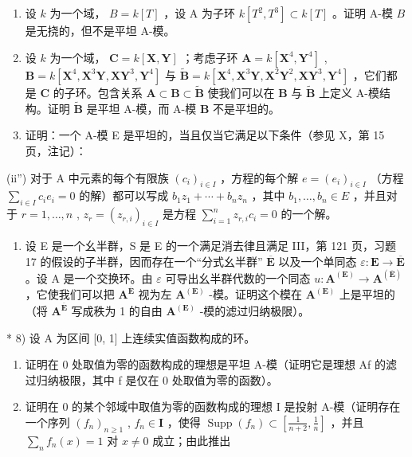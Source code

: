 \begin{enumerate}
\def\labelenumi{\arabic{enumi})}
\setcounter{enumi}{3}
\item
  设 \(k\) 为一个域， \(B = k[T]\) ，设 A 为子环 \(k[T^2, T^3] \subset k[T]\) 。证明 A-模 \(B\) 是无挠的，但不是平坦 A-模。
\item
  设 \(k\) 为一个域， \(\mathbf{C} = k[\mathbf{X}, \mathbf{Y}]\) ；考虑子环 \(\mathbf{A} = k[\mathbf{X}^4, \mathbf{Y}^4]\) , \(\mathbf{B} = k[\mathbf{X}^4, \mathbf{X}^3\mathbf{Y}, \mathbf{XY}^3, \mathbf{Y}^4]\) 与 \(\tilde{\mathbf{B}} = k[\mathbf{X}^4, \mathbf{X}^3\mathbf{Y}, \mathbf{X}^2\mathbf{Y}^2, \mathbf{XY}^3, \mathbf{Y}^4]\) ，它们都是 \(\mathbf{C}\) 的子环。包含关系 \(\mathbf{A} \subset \mathbf{B} \subset \tilde{\mathbf{B}}\) 使我们可以在 \(\mathbf{B}\) 与 \(\tilde{\mathbf{B}}\) 上定义 A-模结构。证明 \(\tilde{\mathbf{B}}\) 是平坦 A-模，而 A-模 \(\mathbf{B}\) 不是平坦的。
\item
  证明：一个 A-模 E 是平坦的，当且仅当它满足以下条件（参见 X，第 15 页，注记）：
\end{enumerate}

(ii'') 对于 A 中元素的每个有限族 \((c_{i})_{i\in I}\) ，方程的每个解 \(e = (e_i)_{i\in I}\) （方程 \(\sum_{i\in I}c_i e_i = 0\) 的解）都可以写成 \(b_1 z_1 + \cdots + b_n z_n\) ，其中 \(b_1, \ldots, b_n \in E\) ，并且对于 \(r = 1, \ldots, n\) , \(z_r = (z_{r,i})_{i \in I}\) 是方程 \(\sum_{i=1}^{n} z_{r,i} c_i = 0\) 的一个解。

\begin{enumerate}
\def\labelenumi{\arabic{enumi})}
\setcounter{enumi}{6}
\tightlist
\item
  设 E 是一个幺半群，S 是 E 的一个满足消去律且满足 III，第 121 页，习题 17 的假设的子半群，因而存在一个“分式幺半群” \(\overline{\mathbf{E}}\) 以及一个单同态 \(\varepsilon: \mathbf{E} \to \overline{\mathbf{E}}\) 。设 A 是一个交换环。由 \(\varepsilon\) 可导出幺半群代数的一个同态 \(u: \mathbf{A}^{(\mathbf{E})} \to \mathbf{A}^{(\overline{\mathbf{E}})}\) ，它使我们可以把 \(\mathbf{A}^{\overline{\mathbf{E}}}\) 视为左 \(\mathbf{A}^{(\mathbf{E})}\) -模。证明这个模在 \(\mathbf{A}^{(\mathbf{E})}\) 上是平坦的（将 \(\mathbf{A}^{\overline{\mathbf{E}}}\) 写成秩为 1 的自由 \(\mathbf{A}^{(\mathbf{E})}\) -模的滤过归纳极限）。
\end{enumerate}

* 8) 设 A 为区间 {[}0, 1{]} 上连续实值函数构成的环。

\begin{enumerate}
\def\labelenumi{\alph{enumi})}
\item
  证明在 0 处取值为零的函数构成的理想是平坦 A-模（证明它是理想 Af 的滤过归纳极限，其中 f 是仅在 0 处取值为零的函数）。
\item
  证明在 0 的某个邻域中取值为零的函数构成的理想 I 是投射 A-模（证明存在一个序列 \((f_n)_{n\geqslant 1}\) , \(f_n\in \mathbf{I}\) ，使得 \(\operatorname {Supp}(f_n)\subset \left[\frac{1}{n + 2},\frac{1}{n}\right]\) ，并且 \(\sum_{n}f_{n}(x) = 1\) 对 \(x\neq 0\) 成立；由此推出
\end{enumerate}

